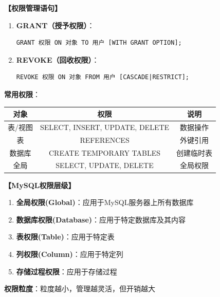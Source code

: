 \documentclass[12pt, a4paper]{article}
\newenvironment{bluebox}[1]{%
  \begin{trivlist}
  \item[\hskip\labelsep \textbf{#1}]
  \setlength{\parskip}{0.5ex}
  \setlength{\itemsep}{0.5ex}
}{%
  \end{trivlist}
}
\begin{document}
\begin{bluebox}{GRANT与REVOKE}
	\textbf{【权限管理语句】}

	\begin{enumerate}[leftmargin=*, label=\textbf{\arabic*.}]
		\item \textbf{GRANT（授予权限）}：
		      \begin{verbatim}
GRANT 权限 ON 对象 TO 用户 [WITH GRANT OPTION];
		      \end{verbatim}
		\item \textbf{REVOKE（回收权限）}：
		      \begin{verbatim}
REVOKE 权限 ON 对象 FROM 用户 [CASCADE|RESTRICT];
		      \end{verbatim}
	\end{enumerate}

	\textbf{常用权限}：
	\begin{tabular}{|c|c|c|}
		\hline
		\textbf{对象} & \textbf{权限}                    & \textbf{说明} \\
		\hline
		表/视图        & SELECT, INSERT, UPDATE, DELETE & 数据操作        \\
		\hline
		表           & REFERENCES                     & 外键引用        \\
		\hline
		数据库         & CREATE TEMPORARY TABLES        & 创建临时表       \\
		\hline
		全局          & SELECT, UPDATE, DELETE         & 全局权限        \\
		\hline
	\end{tabular}
\end{bluebox}

\begin{bluebox}{权限级别}
	\textbf{【MySQL权限层级】}

	\begin{enumerate}[leftmargin=*, label=\textbf{\arabic*.}]
		\item \textbf{全局权限(Global)}：应用于MySQL服务器上所有数据库
		\item \textbf{数据库权限(Database)}：应用于特定数据库及其内容
		\item \textbf{表权限(Table)}：应用于特定表
		\item \textbf{列权限(Column)}：应用于特定列
		\item \textbf{存储过程权限}：应用于存储过程
	\end{enumerate}

	\textbf{权限粒度}：粒度越小，管理越灵活，但开销越大
\end{bluebox}
\end{document}
